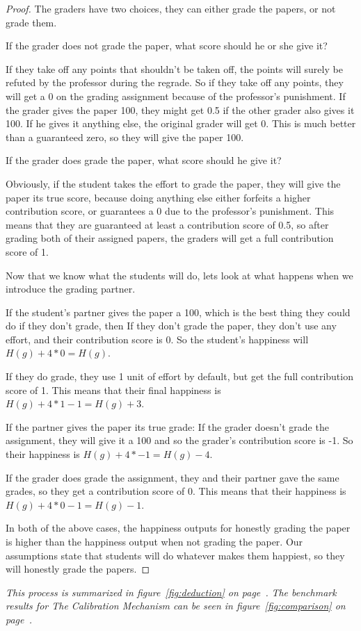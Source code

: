 \documentclass[12pt, Arial]{article}
\begin{document}
\begin{proof}
The graders have two choices, they can either grade the papers, or not grade them.

If the grader does not grade the paper, what score should he or she give it?

If they take off any points that shouldn't be taken off, the points will surely be refuted by the professor during the regrade.
So if they take off any points, they will get a 0 on the grading assignment because of the professor's punishment.
If the grader gives the paper 100, they might get 0.5 if the other grader also gives it 100. If he gives it anything else, the original grader will get 0. This is much better than a guaranteed zero, so they will give the paper 100.

If the grader does grade the paper, what score should he give it?

Obviously, if the student takes the effort to grade the paper, they will give the paper its true score, because doing anything else either forfeits a higher contribution score, or guarantees a 0 due to the professor's punishment. This means that they are guaranteed at least a contribution score of 0.5, so after grading both of their assigned papers, the graders will get a full contribution score of 1.

Now that we know what the students will do, lets look at what happens when we introduce the grading partner. 

If the student's partner gives the paper a 100, which is the best thing they could do if they don't grade, then
	If they don't grade the paper, they don't use any effort, and their contribution score is 0. So the student's happiness will $H(g) + 4*0 = H(g)$.

If they do grade, they use 1 unit of effort by default, but get the full contribution score of 1. This means that their final happiness is $H(g) + 4*1 - 1 = H(g)+3$.
	
If the partner gives the paper its true grade:
	If the grader doesn't grade the assignment, they will give it a 100 and so the grader's contribution score is -1. So their happiness is $H(g) + 4*-1 = H(g)-4$.

If the grader does grade the assignment, they and their partner gave the same grades, so they get a contribution score of 0. This means that their happiness is $H(g) + 4*0 - 1 = H(g)-1$.
	
In both of the above cases, the happiness outputs for honestly grading the paper is higher than the happiness output when not grading the paper. Our assumptions state that students will do whatever makes them happiest, so they will honestly grade the papers.

\end{proof}
\noindent
\emph{This process is summarized in figure~\ref{fig:deduction} on page~\pageref{fig:deduction}.}
\newline
\emph{The benchmark results for The Calibration Mechanism can be seen in figure~\ref{fig:comparison} on page~\pageref{fig:comparison}.}
\end{document}
